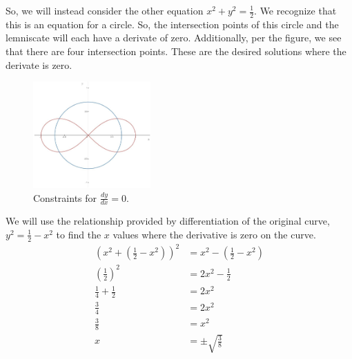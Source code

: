 \documentclass[../hw3.tex]{subfiles}
\begin{document}
So, we will instead consider the other equation $x^2+y^2=\frac{1}{2}$. We recognize that this is an equation for a circle. So, the intersection points of this circle and the lemniscate will each have a derivate of zero. Additionally, per the figure, we see that there are four intersection points. These are the desired solutions where the derivate is zero.
  
\begin{figure}[ht]
    \centering
    \includegraphics[width=0.4\textwidth]{figures/lemniscate.jpg}  %
    \caption{Constraints for $\frac{dy}{dx} = 0$.}
    \label{fig:lemniscate}
\end{figure}

We will use the relationship provided by differentiation of the original curve, $y^2 = \frac{1}{2} - x^2$ to find the $x$ values where the derivative is zero on the curve.
\begin{align*}
    {\left( x^2 + \left( \frac{1}{2} - x^2 \right) \right)}^2 &= x^2 - \left( \frac{1}{2} - x^2 \right) \\
    {\left(\frac{1}{2}\right)}^2&=2x^2-\frac{1}{2} \\
    \frac{1}{4} + \frac{1}{2} &= 2x^2 \\
    \frac{3}{4} &= 2x^2 \\
    \frac{3}{8} &= x^2 \\
    x &= \pm \sqrt{\frac{3}{8}} \\
\end{align*}
\end{document}

